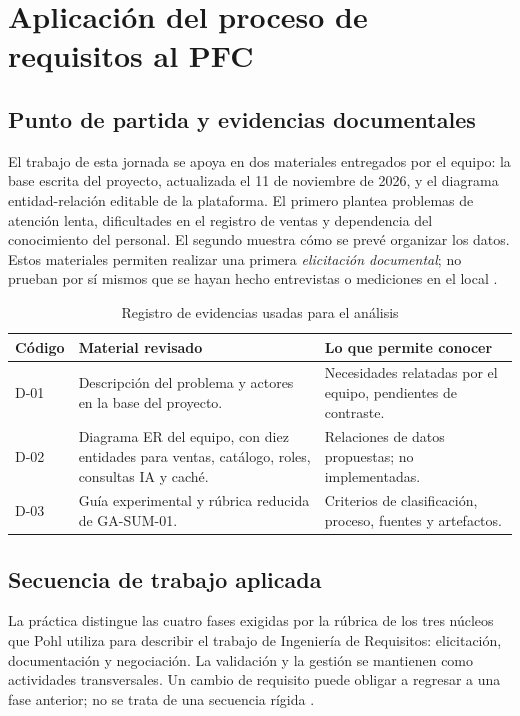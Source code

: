 
\section{Aplicación del proceso de requisitos al PFC}
\subsection{Punto de partida y evidencias documentales}
El trabajo de esta jornada se apoya en dos materiales entregados por el equipo: la base escrita del proyecto, actualizada el 11 de noviembre de 2026, y el diagrama entidad-relación editable de la plataforma. El primero plantea problemas de atención lenta, dificultades en el registro de ventas y dependencia del conocimiento del personal. El segundo muestra cómo se prevé organizar los datos. Estos materiales permiten realizar una primera \emph{elicitación documental}; no prueban por sí mismos que se hayan hecho entrevistas o mediciones en el local \cite{basePFC2026,erPFC2026,iso29148}.

\begin{table}[!ht]
\centering\scriptsize
\caption{Registro de evidencias usadas para el análisis}
\label{tab:documental}
\begin{tabularx}{\columnwidth}{@{}P{0.85cm}Y P{1.85cm}@{}}
\toprule Código & Material revisado & Lo que permite conocer\\\midrule
D-01 & Descripción del problema y actores en la base del proyecto. & Necesidades relatadas por el equipo, pendientes de contraste.\\
D-02 & Diagrama ER del equipo, con diez entidades para ventas, catálogo, roles, consultas IA y caché. & Relaciones de datos propuestas; no implementadas.\\
D-03 & Guía experimental y rúbrica reducida de GA-SUM-01. & Criterios de clasificación, proceso, fuentes y artefactos.\\
\bottomrule
\end{tabularx}
\end{table}

\subsection{Secuencia de trabajo aplicada}
La práctica distingue las cuatro fases exigidas por la rúbrica de los tres núcleos que Pohl utiliza para describir el trabajo de Ingeniería de Requisitos: elicitación, documentación y negociación. La validación y la gestión se mantienen como actividades transversales. Un cambio de requisito puede obligar a regresar a una fase anterior; no se trata de una secuencia rígida \cite{pohl2025,iso29148,swebok2024}.

